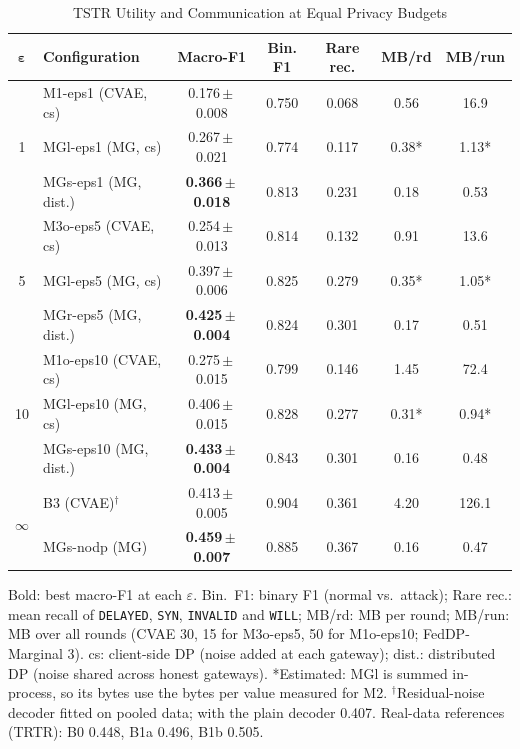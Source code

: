 \documentclass[conference]{IEEEtran}
\begin{document}
\begin{table}[!t]
\centering
\caption{TSTR Utility and Communication at Equal Privacy Budgets}
\label{tab:main}
\scriptsize
\setlength{\tabcolsep}{2.2pt}
\begin{tabular}{c l c c c c c}
\toprule
$\boldsymbol{\varepsilon}$ & \textbf{Configuration} & \textbf{Macro-F1} & \textbf{Bin. F1} & \textbf{Rare rec.} & \textbf{MB/rd} & \textbf{MB/run} \\
\midrule
\multirow{3}{*}{1}  & M1-eps1 (CVAE, cs)        & 0.176\,$\pm$\,0.008 & 0.750 & 0.068 & 0.56 & 16.9 \\
                    & MGl-eps1 (MG, cs)         & 0.267\,$\pm$\,0.021 & 0.774 & 0.117 & 0.38* & 1.13* \\
                    & MGs-eps1 (MG, dist.)      & \textbf{0.366\,$\pm$\,0.018} & 0.813 & 0.231 & 0.18 & 0.53 \\
\midrule
\multirow{3}{*}{5}  & M3o-eps5 (CVAE, cs)       & 0.254\,$\pm$\,0.013 & 0.814 & 0.132 & 0.91 & 13.6 \\
                    & MGl-eps5 (MG, cs)         & 0.397\,$\pm$\,0.006 & 0.825 & 0.279 & 0.35* & 1.05* \\
                    & MGr-eps5 (MG, dist.)      & \textbf{0.425\,$\pm$\,0.004} & 0.824 & 0.301 & 0.17 & 0.51 \\
\midrule
\multirow{3}{*}{10} & M1o-eps10 (CVAE, cs)      & 0.275\,$\pm$\,0.015 & 0.799 & 0.146 & 1.45 & 72.4 \\
                    & MGl-eps10 (MG, cs)        & 0.406\,$\pm$\,0.015 & 0.828 & 0.277 & 0.31* & 0.94* \\
                    & MGs-eps10 (MG, dist.)     & \textbf{0.433\,$\pm$\,0.004} & 0.843 & 0.301 & 0.16 & 0.48 \\
\midrule
\multirow{2}{*}{$\infty$} & B3 (CVAE)$^\dagger$  & 0.413\,$\pm$\,0.005 & 0.904 & 0.361 & 4.20 & 126.1 \\
                    & MGs-nodp (MG)             & \textbf{0.459\,$\pm$\,0.007} & 0.885 & 0.367 & 0.16 & 0.47 \\
\bottomrule
\end{tabular}

\vspace{2pt}
\parbox{\columnwidth}{\scriptsize Bold: best macro-F1 at each $\varepsilon$. Bin.\ F1: binary F1 (normal vs.\ attack); Rare rec.: mean recall of \texttt{DELAYED}, \texttt{SYN}, \texttt{INVALID} and \texttt{WILL}; MB/rd: MB per round; MB/run: MB over all rounds (CVAE 30, 15 for M3o-eps5, 50 for M1o-eps10; FedDP-Marginal 3). cs: client-side DP (noise added at each gateway); dist.: distributed DP (noise shared across honest gateways). *Estimated: MGl is summed in-process, so its bytes use the bytes per value measured for M2. $^\dagger$Residual-noise decoder fitted on pooled data; with the plain decoder 0.407. Real-data references (TRTR): B0 0.448, B1a 0.496, B1b 0.505.}
\end{table}
\end{document}
